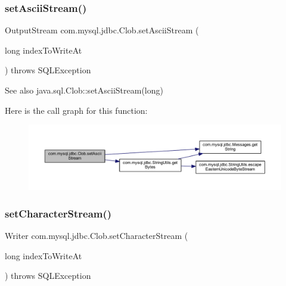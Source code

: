 \subsubsection{\texorpdfstring{set\+Ascii\+Stream()}{setAsciiStream()}}
{\footnotesize\ttfamily Output\+Stream com.\+mysql.\+jdbc.\+Clob.\+set\+Ascii\+Stream (\begin{DoxyParamCaption}\item[{long}]{index\+To\+Write\+At }\end{DoxyParamCaption}) throws S\+Q\+L\+Exception}

\begin{DoxySeeAlso}{See also}
java.\+sql.\+Clob\+::set\+Ascii\+Stream(long) 
\end{DoxySeeAlso}
Here is the call graph for this function\+:\nopagebreak
\begin{figure}[H]
\begin{center}
\leavevmode
\includegraphics[width=350pt]{classcom_1_1mysql_1_1jdbc_1_1_clob_a9c7635d9d09a1693f072576a818fca24_cgraph}
\end{center}
\end{figure}
\mbox{\label{classcom_1_1mysql_1_1jdbc_1_1_clob_a22d27bf737bec9eae054c624955c767f}} 
\subsubsection{\texorpdfstring{set\+Character\+Stream()}{setCharacterStream()}}
{\footnotesize\ttfamily Writer com.\+mysql.\+jdbc.\+Clob.\+set\+Character\+Stream (\begin{DoxyParamCaption}\item[{long}]{index\+To\+Write\+At }\end{DoxyParamCaption}) throws S\+Q\+L\+Exception}

